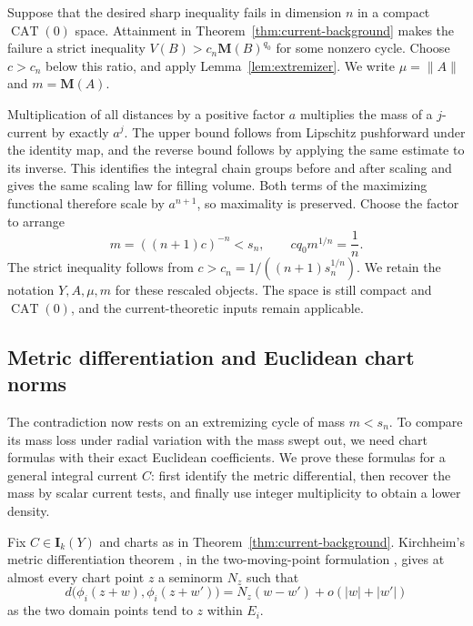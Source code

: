 \documentclass[11pt]{article}
\numberwithin{equation}{section}
\theoremstyle{definition}
\theoremstyle{remark}
\newcommand{\I}{\mathbf I}
\newcommand{\M}{\mathbf M}
\begin{document}
Suppose that the desired sharp inequality fails in dimension \(n\) in
a compact \(\operatorname{CAT}(0)\) space. Attainment in
Theorem~\ref{thm:current-background} makes the failure a strict inequality
\(V(B)>c_n\M(B)^{q_0}\) for some nonzero cycle. Choose
\(c>c_n\) below this ratio, and apply Lemma~\ref{lem:extremizer}.
We write
\(\mu=\|A\|\) and \(m=\M(A)\).

Multiplication of all distances by a positive factor \(a\) multiplies
the mass of a \(j\)-current by exactly \(a^j\). The upper bound follows
from Lipschitz pushforward under the identity map, and the reverse bound
follows by applying the same estimate to its inverse. This identifies
the integral chain groups before and after scaling and gives the same
scaling law for filling volume. Both terms of the maximizing functional
therefore scale by \(a^{n+1}\), so maximality is preserved. Choose the
factor to arrange
\begin{equation}
\label{eq:normalization}
 m=((n+1)c)^{-n}<s_n,
 \qquad cq_0m^{1/n}=\frac1n.
\end{equation}
The strict inequality follows from
\(c>c_n=1/((n+1)s_n^{1/n})\).
We retain the notation \(Y,A,\mu,m\) for these rescaled objects. The
space is still compact and \(\operatorname{CAT}(0)\), and the
current-theoretic inputs remain applicable.

\subsection{Metric differentiation and Euclidean chart norms}

The contradiction now rests on an extremizing cycle of mass $m<s_n$.
To compare its mass loss under radial variation with the mass swept out,
we need chart formulas with their exact Euclidean coefficients. We prove
these formulas for a general integral current $C$: first identify the
metric differential, then recover the mass by scalar current tests, and
finally use integer multiplicity to obtain a lower density.

Fix \(C\in\I_k(Y)\) and charts as in
Theorem~\ref{thm:current-background}. Kirchheim's metric differentiation
theorem \cite[Theorem~2]{Kirchheim1994}, in the two-moving-point formulation
\cite[Definition~(1.3) and Theorem~1.1]{Duda2007}, gives at almost every
chart point \(z\) a seminorm \(N_z\) such that
\begin{equation}
\label{eq:two-point-metric-differential}
 d\bigl(\phi_i(z+w),\phi_i(z+w')\bigr)
 =N_z(w-w')+o(|w|+|w'|)
\end{equation}
as the two domain points tend to \(z\) within \(E_i\).
\end{document}
